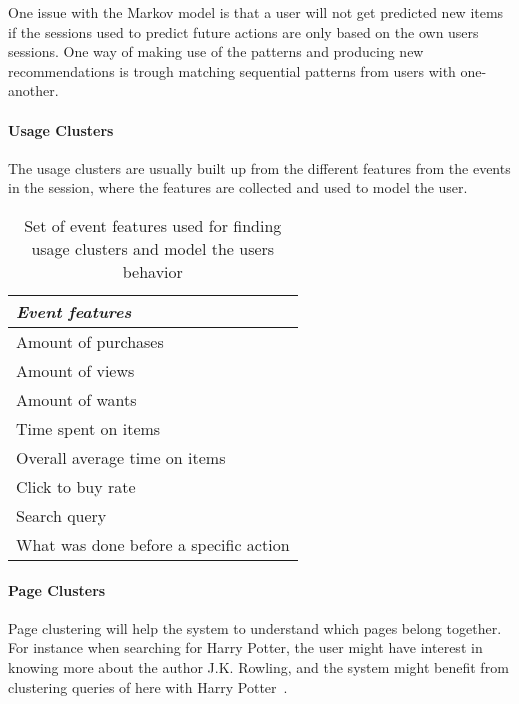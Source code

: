     One issue with the Markov model is that a user will not get predicted new items if the sessions used to predict future actions are only based on the own users sessions.
    One way of making use of the patterns and producing new recommendations is trough matching sequential patterns from users with one-another. 


\paragraph{Usage Clusters} %
\label{subp:usage_clusters}
    The usage clusters are usually built up from the different features from the events in the session, where the features are collected and used to model the user.

    \begin{table}[H]
        \centering
        \begin{tabular}{l}
        	\toprule
            \emph{Event features} \\ \midrule
            Amount of purchases \\ 
            Amount of views \\ 
            Amount of wants  \\ 
            Time spent on items \\ 
            Overall average time on items \\
            Click to buy rate \\ 
            Search query~\cite{Zhang:2006:MSE:1135777.1136004}  \\ 
            What was done before a specific action  \\ 
            \bottomrule
        \end{tabular}
        \caption[Event Features]{Set of event features used for finding usage clusters and model the users behavior}
        \label{table:uasageCluster}
    \end{table}

\paragraph{Page Clusters} %
\label{subp:page_clusters}
    Page clustering will help the system to understand which pages belong together.
    For instance when searching for Harry Potter, the user might have interest in knowing more about the author J.K. Rowling, and the system might benefit from clustering queries of here with Harry Potter~\cite{Zhang:2006:MSE:1135777.1136004}.


